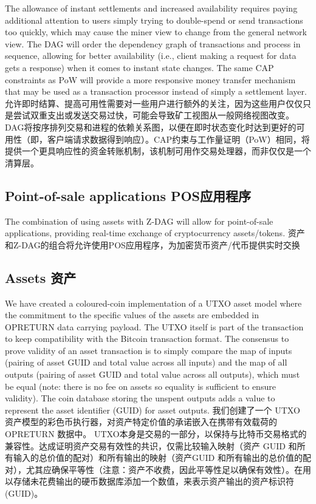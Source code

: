 \documentclass{ctexart}
\begin{document}
The allowance of instant settlements and increased availability requires paying additional attention to users simply trying to double-spend or send transactions too quickly, which may cause the miner view to change from the general network view. The DAG will order the dependency graph of transactions and process in sequence, allowing for better availability (i.e., client making a request for data gets a response) when it comes to instant state changes. The same CAP constraints as PoW will provide a more responsive money transfer mechanism that may be used as a transaction processor instead of simply a settlement layer. 允许即时结算、提高可用性需要对一些用户进行额外的关注，因为这些用户仅仅只是尝试双重支出或发送交易过快，可能会导致矿工视图从一般网络视图改变。DAG将按序排列交易和进程的依赖关系图，以便在即时状态变化时达到更好的可用性（即，客户端请求数据得到响应）。CAP约束与工作量证明（PoW）相同，将提供一个更具响应性的资金转账机制，该机制可用作交易处理器，而非仅仅是一个清算层。

\subsection{Point-of-sale applications POS应用程序}
The combination of using assets with Z-DAG will allow for point-of-sale applications, providing real-time exchange of cryptocurrency assets/tokens. 资产和Z-DAG的组合将允许使用POS应用程序，为加密货币资产/代币提供实时交换

\subsection{Assets 资产}
We have created a coloured-coin implementation of a UTXO asset model where the commitment to the specific values of the assets are embedded in OPRETURN data carrying payload. The UTXO itself is part of the transaction to keep compatibility with the Bitcoin transaction format. The consensus to prove validity of an asset transaction is to simply compare the map of inputs (pairing of asset GUID and total value across all inputs) and the map of all outputs (pairing of asset GUID and total value across all outputs), which must be equal (note: there is no fee on assets so equality is sufficient to ensure validity). The coin database storing the unspent outputs adds a value to represent the asset identifier (GUID) for asset outputs. 我们创建了一个 UTXO 资产模型的彩色币执行器，对资产特定价值的承诺嵌入在携带有效载荷的 OPRETURN 数据中。 UTXO本身是交易的一部分，以保持与比特币交易格式的兼容性。达成证明资产交易有效性的共识，仅需比较输入映射（资产 GUID 和所有输入的总价值的配对）和所有输出的映射（资产GUID 和所有输出的总价值的配对），尤其应确保平等性（注意：资产不收费，因此平等性足以确保有效性）。在用以存储未花费输出的硬币数据库添加一个数值，来表示资产输出的资产标识符 (GUID)。
\end{document}
